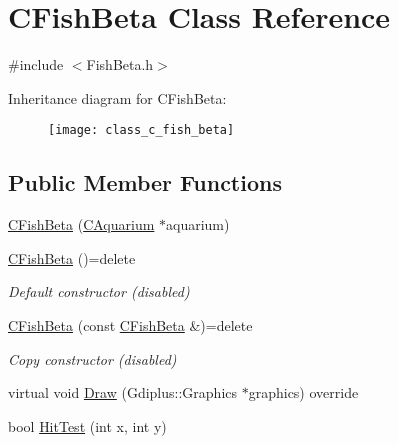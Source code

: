 \hypertarget{class_c_fish_beta}{}\section{C\+Fish\+Beta Class Reference}
\label{class_c_fish_beta}


{\ttfamily \#include $<$Fish\+Beta.\+h$>$}

Inheritance diagram for C\+Fish\+Beta\+:\begin{figure}[H]
\begin{center}
\leavevmode
\texttt{[image: class\_c\_fish\_beta]}
\end{center}
\end{figure}
\subsection*{Public Member Functions}
\begin{DoxyCompactItemize}
\item 
\mbox{\hyperlink{class_c_fish_beta_a021073e2e0034271cd7e776b1e3fed29}{C\+Fish\+Beta}} (\mbox{\hyperlink{class_c_aquarium}{C\+Aquarium}} $\ast$aquarium)
\item 
\mbox{\label{class_c_fish_beta_a4e4d132618735adad44d04c9c40687ca}} 
\mbox{\hyperlink{class_c_fish_beta_a4e4d132618735adad44d04c9c40687ca}{C\+Fish\+Beta}} ()=delete
\begin{DoxyCompactList}\small\item\em Default constructor (disabled) \end{DoxyCompactList}\item 
\mbox{\label{class_c_fish_beta_adbf3559baac135dff393729c51b1ab31}} 
\mbox{\hyperlink{class_c_fish_beta_adbf3559baac135dff393729c51b1ab31}{C\+Fish\+Beta}} (const \mbox{\hyperlink{class_c_fish_beta}{C\+Fish\+Beta}} \&)=delete
\begin{DoxyCompactList}\small\item\em Copy constructor (disabled) \end{DoxyCompactList}\item 
virtual void \mbox{\hyperlink{class_c_fish_beta_a52e78e404e78d8b676c6b3a5916043eb}{Draw}} (Gdiplus\+::\+Graphics $\ast$graphics) override
\item 
bool \mbox{\hyperlink{class_c_fish_beta_a5bdd3d07a57ca1f01a7f2c5c00e0a662}{Hit\+Test}} (int x, int y)
\end{DoxyCompactItemize}

